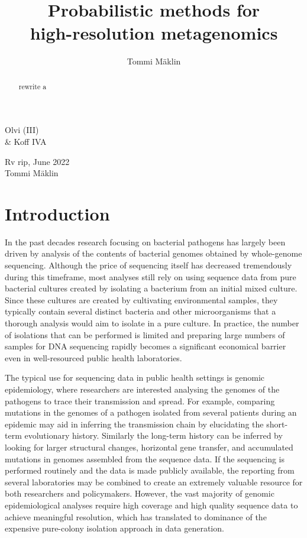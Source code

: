 \documentclass[officiallayout]{tktla}
\title{Probabilistic methods for \\ high-resolution metagenomics}
\author{Tommi Mäklin}
\begin{document}
\frontmatter

\maketitle

\begin{abstract}
  rewrite \citet{maklin_high-resolution_2021} a \citep{maklin_bacterial_2021}

\end{abstract}

\begin{acknowledgements}
  Olvi (III) \\ \& Koff IVA
   \begin{flushright}
  Rv  rip, June 2022\\
  Tommi Mäklin
  \end{flushright}
\end{acknowledgements}

\tableofcontents

\mainmatter

\chapter{Introduction}

In the past decades research focusing on bacterial pathogens has
largely been driven by analysis of the contents of bacterial genomes
obtained by whole-genome sequencing. Although the price of sequencing
itself has decreased tremendously during this timeframe, most analyses
still rely on using sequence data from pure bacterial cultures created
by isolating a bacterium from an initial mixed culture. Since these
cultures are created by cultivating environmental samples, they
typically contain several distinct bacteria \textemdash and other
microorganisms \textemdash that a thorough analysis would aim to
isolate in a pure culture. In practice, the number of isolations that
can be performed is limited and preparing large numbers of samples for
DNA sequencing rapidly becomes a significant economical barrier even
in well-resourced public health laboratories.

The typical use for sequencing data in public health settings is
genomic epidemiology, where researchers are interested analysing the
genomes of the pathogens to trace their transmission and spread. For
example, comparing mutations in the genomes of a pathogen isolated
from several patients during an epidemic may aid in inferring the
transmission chain by elucidating the short-term evolutionary
history. Similarly the long-term history can be inferred by looking
for larger structural changes, horizontal gene transfer, and
accumulated mutations in genomes assembled from the sequence data. If
the sequencing is performed routinely and the data is made publicly
available, the reporting from several laboratories may be combined to
create an extremely valuable resource for both researchers and
policymakers. However, the vast majority of genomic epidemiological
analyses require high coverage and high quality sequence data to
achieve meaningful resolution, which has translated to dominance of
the expensive pure-colony isolation approach in data generation.
\end{document}
